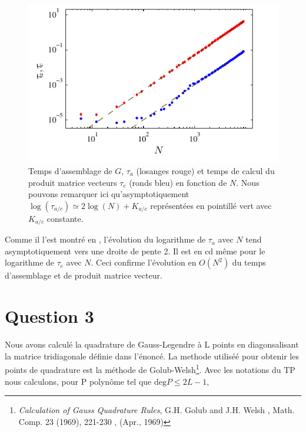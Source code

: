 \documentclass[10pt]{article}
\begin{document}
\begin{multicols}{2}
\begin{figure}[H]
  \begin{center}
  \includegraphics[width=0.95\columnwidth]{Q2b_4.pdf}
  \vspace*{-11pt}
  \caption{Temps d'assemblage de $G$, $\tau_a$ (losanges rouge) et temps de calcul du produit matrice vecteurs $\tau_c$  (ronds bleu) en fonction de $N$. Nous pouvons remarquer ici qu'asymptotiquement $\log(\tau_{a/c}) \simeq 2\log(N)+K_{a/c}$ représentées en pointillé vert avec $K_{a/c}$ constante.}
  \label{fig:Q2b} 
  \end{center}
\end{figure}
\vspace*{-22pt}

Comme il l'est montré en , l'évolution du logarithme de $\tau_a$ avec $N$ tend asymptotiquement vers une droite de pente 2. Il est en cd même pour le logarithme de $\tau_c$ avec $N$. Ceci confirme l'évolution en $O(N^{2})$ du temps d'assemblage et de produit matrice vecteur.



\vspace*{22pt}

\section*{Question 3}

Nous avons calculé la quadrature de Gauss-Legendre à L points en diagonsalisant la matrice tridiagonale définie dans l'énoncé. La methode utiliséé pour obtenir les points de quadrature est la méthode de Golub-Welsh\footnote{\textit{Calculation of Gauss Quadrature Rules}, G.H. Golub and J.H. Welsh \color{cyan}, Math. Comp. 23 (1969), 221-230 \color{black}, (Apr., 1969)}. Avec les notations du TP nous calculons, pour P polynôme tel que $\text{deg}P \le 2L-1$,


\end{multicols}
\end{document}
